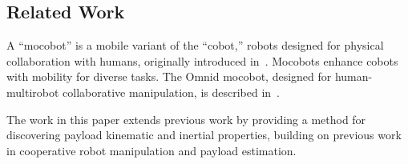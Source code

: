 \documentclass[letterpaper, 10 pt, journal, twoside]{IEEEtran}
\newcommand{\wrench}{{\mathcal F}}
\newcommand{\twist}{{\mathcal V}}
\begin{document}




\subsection{Related Work} 
A ``mocobot'' is a mobile variant of the ``cobot,'' robots designed for physical collaboration with humans, originally introduced in~\cite{colgate1996cobots}. Mocobots enhance cobots with mobility for diverse tasks. The Omnid mocobot, designed for human-multirobot collaborative manipulation, is described in~\cite{elwin2022human}. 

The work in this paper extends previous work by providing a method for discovering payload kinematic and inertial properties, building on previous work in cooperative robot manipulation and payload estimation.
\end{document}
